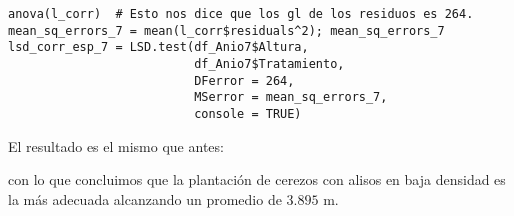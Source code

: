 \documentclass[a4paper,10pt]{article}
\begin{document}
\begin{lstlisting}
anova(l_corr)  # Esto nos dice que los gl de los residuos es 264.
mean_sq_errors_7 = mean(l_corr$residuals^2); mean_sq_errors_7
lsd_corr_esp_7 = LSD.test(df_Anio7$Altura,
                          df_Anio7$Tratamiento,
                          DFerror = 264,
                          MSerror = mean_sq_errors_7,
                          console = TRUE)
\end{lstlisting}

El resultado es el mismo que antes:



con lo que concluimos que la plantación de cerezos con alisos en baja densidad es la más adecuada alcanzando un promedio de $3.895$ m.
\end{document}
